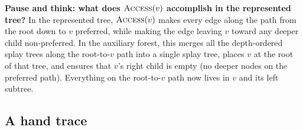 \begin{recoverybox}
\textbf{Pause and think: what does $\textsc{Access}(v)$ accomplish in the represented tree?}
In the represented tree, $\textsc{Access}(v)$ makes every edge along the path from the root down to $v$ preferred, while making the edge leaving $v$ toward any deeper child non-preferred. In the auxiliary forest, this merges all the depth-ordered splay trees along the root-to-$v$ path into a single splay tree, places $v$ at the root of that tree, and ensures that $v$'s right child is empty (no deeper nodes on the preferred path). Everything on the root-to-$v$ path now lives in $v$ and its left subtree.
\end{recoverybox}

\subsection{A hand trace}

